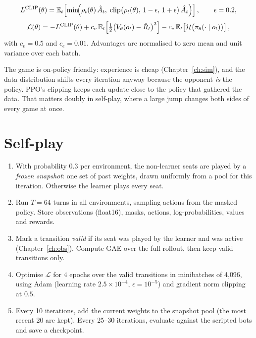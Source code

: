 \begin{defbox}
\[
  L^{\text{CLIP}}(\theta) = \mathbb{E}_t\!\left[\min\!\Bigl(\rho_t(\theta)\,\hat A_t,\;
     \operatorname{clip}\bigl(\rho_t(\theta),\,1-\epsilon,\,1+\epsilon\bigr)\,\hat A_t\Bigr)\right],
  \qquad \epsilon = 0.2,
\]
\[
  \mathcal{L}(\theta) = -L^{\text{CLIP}}(\theta)
    + c_v\,\mathbb{E}_t\!\left[\tfrac12\bigl(V_\theta(o_t)-\hat R_t\bigr)^2\right]
    - c_e\,\mathbb{E}_t\!\left[\mathcal{H}\bigl(\pi_\theta(\cdot\mid o_t)\bigr)\right],
\]
with $c_v=0.5$ and $c_e=0.01$. Advantages are normalised to zero mean and unit variance
over each batch.
\end{defbox}

\begin{keybox}
The game is on-policy friendly: experience is cheap (Chapter~\ref{ch:sim}), and the
data distribution shifts every iteration anyway because the opponent \emph{is} the
policy. PPO's clipping keeps each update close to the policy that gathered the data. That
matters doubly in self-play, where a large jump changes both sides of every game at
once.
\end{keybox}

\section{Self-play}

\begin{algbox}
\begin{enumerate}
\item With probability $0.3$ per environment, the non-learner seats are played by a
  \emph{frozen snapshot}: one set of past weights, drawn uniformly from a pool for this
  iteration. Otherwise the learner plays every seat.
\item Run $T=64$ turns in all environments, sampling actions from the masked policy.
  Store observations (float16), masks, actions, log-probabilities, values and rewards.
\item Mark a transition \emph{valid} if its seat was played by the learner and was active
  (Chapter~\ref{ch:obs}). Compute GAE over the full rollout, then keep valid transitions
  only.
\item Optimise $\mathcal{L}$ for 4 epochs over the valid transitions in minibatches of
  4{,}096, using Adam (learning rate $2.5\times10^{-4}$, $\epsilon=10^{-5}$) and gradient
  norm clipping at $0.5$.
\item Every 10 iterations, add the current weights to the snapshot pool (the most recent
  20 are kept). Every 25--30 iterations, evaluate against the scripted bots and save a
  checkpoint.
\end{enumerate}
\end{algbox}

